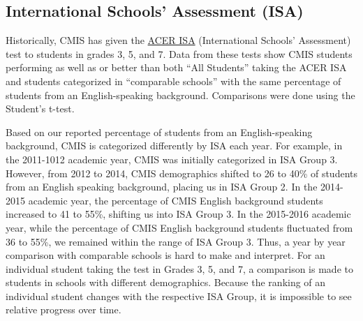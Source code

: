  

\subsection{International Schools’ Assessment (ISA)}

Historically, CMIS has given the \href{https://drive.google.com/drive/u/0/folders/0B71_pYxcTLo-anRvTzA5NDBGUW8}{ACER ISA} (International Schools’ Assessment) test to students in grades 3, 5, and 7.  Data from these tests show CMIS students performing as well as or better than both “All Students” taking the ACER ISA and students categorized in “comparable schools” with the same percentage of students from an English-speaking background.  Comparisons were done using the Student’s t-test. 



Based on our reported percentage of students from an English-speaking background, CMIS is categorized differently by ISA each year.  For example, in the 2011-1012 academic year, CMIS was initially categorized in ISA Group 3.  However, from 2012 to 2014, CMIS demographics shifted to 26 to 40\% of students from an English speaking background, placing us in ISA Group 2.  In the 2014-2015 academic year, the percentage of CMIS English background students increased to 41 to 55\%, shifting us into ISA Group 3.  In the 2015-2016 academic year, while the percentage of CMIS English background students fluctuated from 36 to 55\%, we remained within the range of ISA Group 3.  Thus, a year by year comparison with comparable schools is hard to make and interpret.  For an individual student taking the test in Grades 3, 5, and 7, a comparison is made to students in schools with different demographics.  Because the ranking of an individual student changes with the respective ISA Group, it is impossible to see relative progress over time.  

